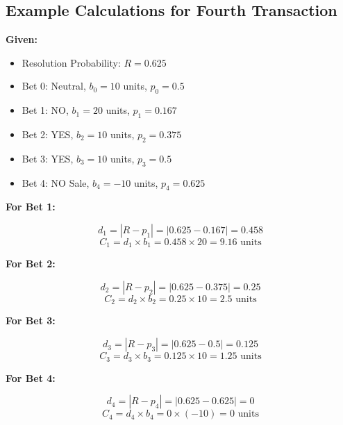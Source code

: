 \documentclass{article}
\begin{document}
\subsection*{Example Calculations for Fourth Transaction}

\textbf{Given:}

\begin{itemize}
  \item Resolution Probability: \( R = 0.625 \)
  \item Bet 0: Neutral, \( b_0 = 10 \) units, \( p_0 = 0.5 \)
  \item Bet 1: NO, \( b_1 = 20 \) units, \( p_1 = 0.167 \)
  \item Bet 2: YES, \( b_2 = 10 \) units, \( p_2 = 0.375 \)
  \item Bet 3: YES, \( b_3 = 10 \) units, \( p_3 = 0.5 \)
  \item Bet 4: NO Sale, \( b_4 = -10 \) units, \( p_4 = 0.625 \)
\end{itemize}

\textbf{For Bet 1:}

\[
d_1 = |R - p_1| = |0.625 - 0.167| = 0.458
\]
\[
C_1 = d_1 \times b_1 = 0.458 \times 20 = 9.16 \text{ units}
\]

\textbf{For Bet 2:}

\[
d_2 = |R - p_2| = |0.625 - 0.375| = 0.25
\]
\[
C_2 = d_2 \times b_2 = 0.25 \times 10 = 2.5 \text{ units}
\]

\textbf{For Bet 3:}

\[
d_3 = |R - p_3| = |0.625 - 0.5| = 0.125
\]
\[
C_3 = d_3 \times b_3 = 0.125 \times 10 = 1.25 \text{ units}
\]

\textbf{For Bet 4:}

\[
d_4 = |R - p_4| = |0.625 - 0.625| = 0
\]
\[
C_4 = d_4 \times b_4 = 0 \times (-10) = 0 \text{ units}
\]
\end{document}
